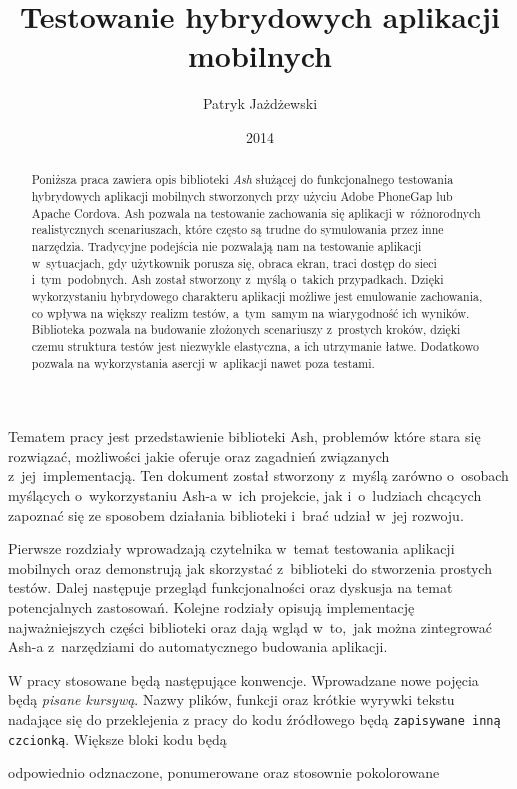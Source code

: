 \documentclass[brudnopis]{xmgr}
\author   {Patryk Jażdżewski}
\title    {Testowanie hybrydowych aplikacji mobilnych}
\date     {2014}
\begin{document}
\begin{abstract}

  Poniższa praca zawiera opis biblioteki \textit{Ash} służącej do funkcjonalnego testowania
hybrydowych aplikacji mobilnych stworzonych przy użyciu Adobe PhoneGap lub
Apache Cordova. Ash pozwala na testowanie zachowania się aplikacji w~różnorodnych
realistycznych scenariuszach, które często są trudne do symulowania przez inne narzędzia. Tradycyjne podejścia nie pozwalają nam na testowanie aplikacji w~sytuacjach, gdy  użytkownik porusza się,
obraca ekran, traci dostęp do sieci i~tym~podobnych. Ash został stworzony z~myślą o~takich przypadkach. Dzięki wykorzystaniu hybrydowego charakteru aplikacji
możliwe jest emulowanie zachowania, co wpływa na większy realizm testów, a~tym~samym na wiarygodność ich wyników. 
Biblioteka pozwala na budowanie złożonych scenariuszy z~prostych kroków, dzięki czemu struktura testów jest niezwykle elastyczna, a ich utrzymanie łatwe. 
Dodatkowo pozwala na wykorzystania asercji w~aplikacji nawet poza testami. 

\end{abstract}

\maketitle

\introduction

Tematem pracy jest przedstawienie biblioteki Ash, problemów które stara się rozwiązać, możliwości jakie oferuje oraz zagadnień związanych z~jej~implementacją. Ten dokument  został stworzony z~myślą zarówno o~osobach myślących o~wykorzystaniu Ash-a w~ich projekcie, jak i~o~ludziach chcących zapoznać się ze sposobem działania biblioteki i~brać udział w~jej rozwoju.  

Pierwsze rozdziały wprowadzają czytelnika w~temat testowania aplikacji mobilnych oraz demonstrują jak skorzystać z~biblioteki do stworzenia prostych testów. Dalej następuje przegląd funkcjonalności oraz dyskusja na temat potencjalnych zastosowań. Kolejne rodziały opisują implementację najważniejszych części biblioteki oraz dają wgląd w~to,~jak można zintegrować Ash-a z~narzędziami do automatycznego budowania aplikacji.

W pracy stosowane będą następujące konwencje. Wprowadzane nowe pojęcia będą \textit{pisane kursywą}. Nazwy plików, funkcji oraz krótkie wyrywki tekstu nadające się do przeklejenia z pracy do kodu źródłowego będą \texttt{zapisywane inną czcionką}. Większe bloki kodu będą 
\begin{javascriptcode}
    odpowiednio odznaczone, 
    ponumerowane oraz 
    stosownie pokolorowane
\end{javascriptcode}
\end{document}

